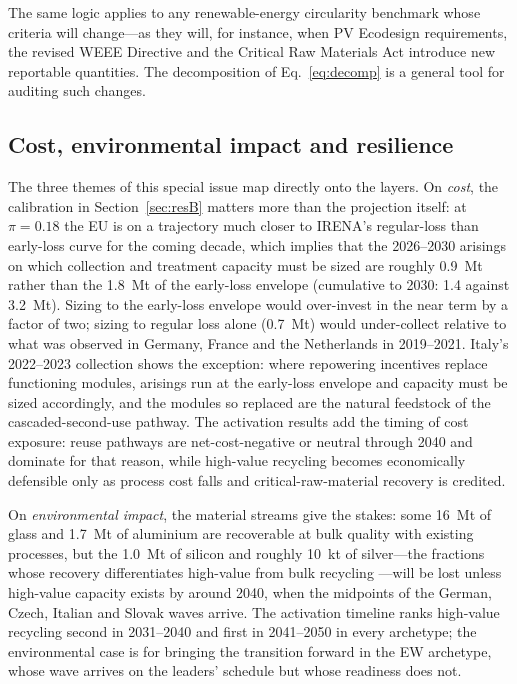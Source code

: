 \documentclass[a4paper,fleqn]{cas-sc}
\begin{document}
The same logic applies to any renewable-energy circularity benchmark whose criteria will change---as they will, for instance, when PV Ecodesign requirements, the revised WEEE Directive and the Critical Raw Materials Act introduce new reportable quantities. The decomposition of Eq.~\eqref{eq:decomp} is a general tool for auditing such changes.

\subsection{Cost, environmental impact and resilience}
The three themes of this special issue map directly onto the layers. On \emph{cost}, the calibration in Section~\ref{sec:resB} matters more than the projection itself: at $\pi=0.18$ the EU is on a trajectory much closer to IRENA's regular-loss than early-loss curve for the coming decade, which implies that the 2026--2030 arisings on which collection and treatment capacity must be sized are roughly \SI{0.9}{Mt} rather than the \SI{1.8}{Mt} of the early-loss envelope (cumulative to 2030: 1.4 against \SI{3.2}{Mt}). Sizing to the early-loss envelope would over-invest in the near term by a factor of two; sizing to regular loss alone (\SI{0.7}{Mt}) would under-collect relative to what was observed in Germany, France and the Netherlands in 2019--2021. Italy's 2022--2023 collection shows the exception: where repowering incentives replace functioning modules, arisings run at the early-loss envelope and capacity must be sized accordingly, and the modules so replaced are the natural feedstock of the cascaded-second-use pathway. The activation results add the timing of cost exposure: reuse pathways are net-cost-negative or neutral through 2040 and dominate for that reason, while high-value recycling becomes economically defensible only as process cost falls and critical-raw-material recovery is credited.

On \emph{environmental impact}, the material streams give the stakes: some \SI{16}{Mt} of glass and \SI{1.7}{Mt} of aluminium are recoverable at bulk quality with existing processes, but the \SI{1.0}{Mt} of silicon and roughly \SI{10}{kt} of silver---the fractions whose recovery differentiates high-value from bulk recycling \citep{latunussa2016,deng2019,heath2020}---will be lost unless high-value capacity exists by around 2040, when the midpoints of the German, Czech, Italian and Slovak waves arrive. The activation timeline ranks high-value recycling second in 2031--2040 and first in 2041--2050 in every archetype; the environmental case is for bringing the transition forward in the EW archetype, whose wave arrives on the leaders' schedule but whose readiness does not.
\end{document}
